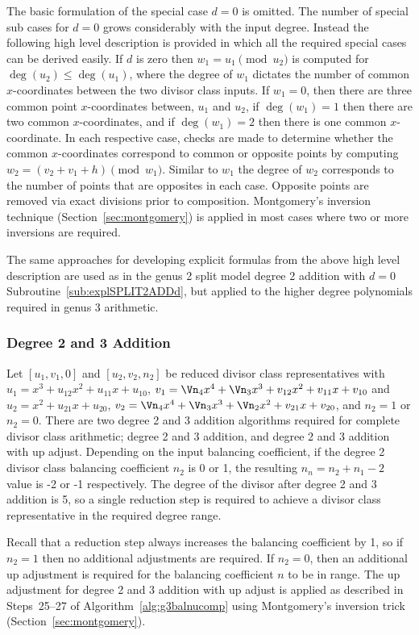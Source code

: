 The basic formulation of the special case $d = 0$ is omitted. The number of
special sub cases for $d=0$ grows considerably with the input degree. Instead
the following high level description is provided in which all the required
special cases can be derived easily. If $d$ is zero then $w_1 = u_1 \pmod {u_2}$
is computed for $\deg(u_2) \leq \deg(u_1)$, where the degree of $w_1$ dictates
the number of common $x$-coordinates between the two divisor class inputs. If
$w_1=0$, then there are three common point $x$-coordinates between, $u_1$ and
$u_2$, if $\deg(w_1) = 1$ then there are two common $x$-coordinates, and if
$\deg(w_1) = 2$ then there is one common $x$-coordinate. In each respective
case, checks are made to determine whether the common $x$-coordinates correspond
to common or opposite points by computing $w_2 = (v_2 + v_1 + h) \pmod{w_1}$.
Similar to $w_1$ the degree of $w_2$ corresponds to the number of points that
are opposites in each case. Opposite points are removed via exact divisions
prior to composition. Montgomery's inversion technique
(Section~\ref{sec:montgomery}) is applied in most cases where two or more
inversions are required. 

The same approaches for developing explicit formulas from the above high level
description are used as in the genus 2 split model degree 2 addition with $d=0$
Subroutine~\ref{sub:explSPLIT2ADDd}, but applied to the higher degree
polynomials required in genus 3 arithmetic.


\subsubsection{Degree 2 and 3 Addition}
Let $[u_1,v_1,0]$ and $[u_2,v_2,n_2]$ be reduced divisor class representatives
with $u_1 = x^3 + u_{12}x^2 + u_{11}x + u_{10}$, $v_1 = \Vn_4x^4 + \Vn_3x^3
+ v_{12}x^2 + v_{11}x + v_{10}$ and $u_2 = x^2 + u_{21}x + u_{20}$, $v_2 =
\Vn_4x^4 + \Vn_3x^3 + \Vn_2x^2 + v_{21}x + v_{20}$, and $n_2 = 1$ or $n_2 = 0$.
There are two degree 2 and 3 addition algorithms required for complete divisor
class arithmetic; degree 2 and 3 addition, and degree 2 and 3 addition with up
adjust. Depending on the input balancing coefficient, if the degree 2 divisor
class balancing coefficient $n_2$ is 0 or 1, the resulting $n_n = n_2 + n_1 - 2$
value is -2 or -1 respectively. The degree of the divisor after degree 2 and 3
addition is 5, so a single reduction step is required to achieve a divisor class
representative in the required degree range. 

Recall that a reduction step always increases the balancing coefficient by 1, so
if $n_2 = 1$ then no additional adjustments are required. If $n_2=0$, then an
additional up adjustment is required for the balancing coefficient $n$ to be in
range. The up adjustment for degree 2 and 3 addition with up adjust is applied
as described in Steps~25--27 of Algorithm~\ref{alg:g3balnucomp} using
Montgomery's inversion trick (Section~\ref{sec:montgomery}). 


